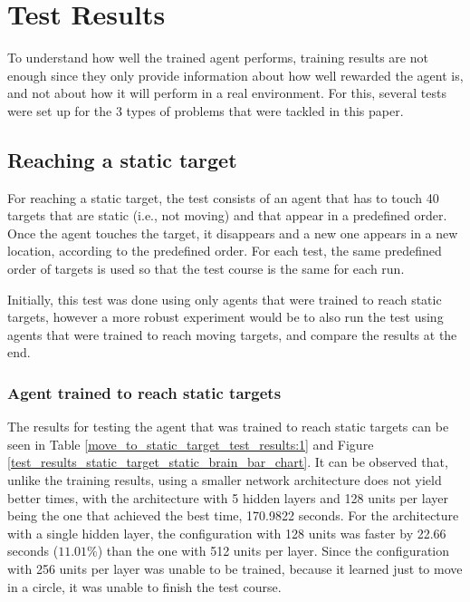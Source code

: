 \chapter{Test Results}

To understand how well the trained agent performs, training results are not enough since they only provide information about how well rewarded the agent is, and not about how it will perform in a real environment. For this, several tests were set up for the 3 types of problems that were tackled in this paper.


\section{Reaching a static target} \label{test_reach_static_target}

For reaching a static target, the test consists of an agent that has to touch 40 targets that are static (i.e., not moving) and that appear in a predefined order. Once the agent touches the target, it disappears and a new one appears in a new location, according to the predefined order. For each test, the same predefined order of targets is used so that the test course is the same for each run. 

Initially, this test was done using only agents that were trained to reach static targets, however a more robust experiment would be to also run the test using agents that were trained to reach moving targets, and compare the results at the end.


\subsection{Agent trained to reach static targets}

The results for testing the agent that was trained to reach static targets can be seen in Table \ref{move_to_static_target_test_results:1} and Figure \ref{test_results_static_target_static_brain_bar_chart}. It can be observed that, unlike the training results, using a smaller network architecture does not yield better times, with the architecture with 5 hidden layers and 128 units per layer being the one that achieved the best time, 170.9822 seconds. For the architecture with a single hidden layer, the configuration with 128 units was faster by 22.66 seconds ($11.01\%$) than the one with 512 units per layer. Since the configuration with 256 units per layer was unable to be trained, because it learned just to move in a circle, it was unable to finish the test course.

